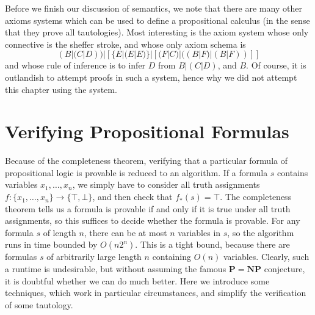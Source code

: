 Before we finish our discussion of semantics, we note that there are many other axioms systems which can be used to define a propositional calculus (in the sense that they prove all tautologies). Most interesting is the axiom system whose only connective is the sheffer stroke, and whose only axiom schema is
%
\[ (B|(C|D))|[\{E|(E|E)\}|[(F|C)|((B|F)|(B|F))]] \]
%
and whose rule of inference is to infer $D$ from $B|(C|D)$, and $B$. Of course, it is outlandish to attempt proofs in such a system, hence why we did not attempt this chapter using the system.

\section{Verifying Propositional Formulas}

Because of the completeness theorem, verifying that a particular formula of propositional logic is provable is reduced to an algorithm. If a formula $s$ contains variables $x_1, \dots, x_n$, we simply have to consider all truth assignments $f: \{ x_1, \dots, x_n \} \to \{ \top, \bot \}$, and then check that $f_*(s) = \top$. The completeness theorem tells us a formula is provable if and only if it is true under all truth assignments, so this suffices to decide whether the formula is provable. For any formula $s$ of length $n$, there can be at most $n$ variables in $s$, so the algorithm runs in time bounded by $O(n2^n)$. This is a tight bound, because there are formulas $s$ of arbitrarily large length $n$ containing $O(n)$ variables. Clearly, such a runtime is undesirable, but without assuming the famous $\mathbf{P} = \mathbf{NP}$ conjecture, it is doubtful whether we can do much better. Here we introduce some techniques, which work in particular circumstances, and simplify the verification of some tautology.

